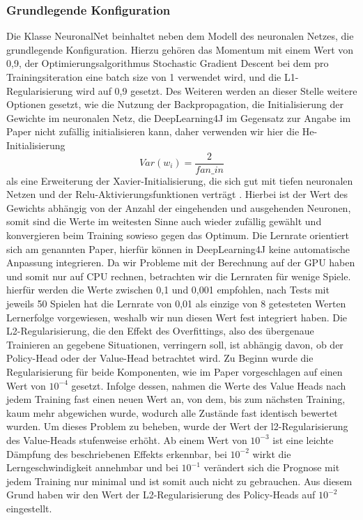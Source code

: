 \documentclass[12pt,a4paper]{article}
\begin{document}
\subsubsection{Grundlegende Konfiguration}
Die Klasse NeuronalNet beinhaltet neben dem Modell des neuronalen Netzes, die grundlegende Konfiguration. Hierzu gehören das Momentum mit einem Wert von 0,9, der Optimierungsalgorithmus \glqq Stochastic Gradient Descent\grqq{} bei dem pro Trainingsiteration eine batch size von 1 verwendet wird, und die L1-Regularisierung wird auf 0,9 gesetzt. Des Weiteren werden an dieser Stelle weitere Optionen gesetzt, wie die Nutzung der Backpropagation, die Initialisierung der Gewichte im neuronalen Netz, die DeepLearning4J im Gegensatz zur Angabe im Paper nicht zufällig initialisieren kann, daher verwenden wir hier die He-Initialisierung
\begin{equation}
Var(w_i) = \frac{2}{fan\_in}
\end{equation}
als eine Erweiterung der Xavier-Initialisierung, die sich gut mit tiefen neuronalen Netzen und der Relu-Aktivierungsfunktionen verträgt \cite{Ghatak.2019}. Hierbei ist der Wert des Gewichts abhängig von der Anzahl der eingehenden und ausgehenden Neuronen, somit sind die Werte im weitesten Sinne auch wieder zufällig gewählt und konvergieren beim Training sowieso gegen das Optimum. Die Lernrate orientiert sich am genannten Paper, hierfür können in DeepLearning4J keine automatische Anpassung integrieren. Da wir Probleme mit der Berechnung auf der GPU haben und somit nur auf CPU rechnen, betrachten wir die Lernraten für wenige Spiele. hierfür werden die Werte zwischen 0,1 und 0,001 empfohlen, nach Tests mit jeweils 50 Spielen hat die Lernrate von 0,01 als einzige von 8 getesteten Werten Lernerfolge vorgewiesen, weshalb wir nun diesen Wert fest integriert haben. Die L2-Regularisierung, die den Effekt des Overfittings, also des übergenaue Trainieren an gegebene Situationen, verringern soll, ist abhängig davon, ob der Policy-Head oder der Value-Head betrachtet wird. Zu Beginn wurde die Regularisierung für beide Komponenten, wie im Paper vorgeschlagen auf einen Wert von $10^{-4}$ gesetzt. Infolge dessen, nahmen die Werte des Value Heads nach jedem Training fast einen neuen Wert an, von dem, bis zum nächsten Training, kaum mehr abgewichen wurde, wodurch alle Zustände fast identisch bewertet wurden. Um dieses Problem zu beheben, wurde der Wert der l2-Regularisierung des Value-Heads stufenweise erhöht. Ab einem Wert von $10^{-3}$ ist eine leichte Dämpfung des beschriebenen Effekts erkennbar, bei $10^{-2}$ wirkt die Lerngeschwindigkeit annehmbar und bei $10^{-1}$ verändert sich die Prognose mit jedem Training nur minimal und ist somit auch nicht zu gebrauchen. Aus diesem Grund haben wir den Wert der L2-Regularisierung des Policy-Heads auf $10^{-2}$ eingestellt.\\
\end{document}
